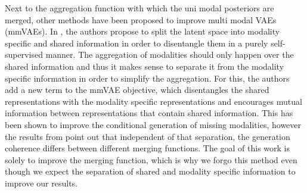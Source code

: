 Next to the aggregation function with which the uni modal posteriors are merged, other methods have been proposed to improve multi modal VAEs (mmVAEs).
In \citep{daun_disent}, the authors propose to split the latent space into modality specific and shared information in order to disentangle \citep{burgess_understanding_2018} them in a purely self-supervised manner.
The aggregation of modalities should only happen over the shared information and thus it makes sense to separate it from the modality specific information in order to simplify the aggregation.
For this, the authors add a new term to the mmVAE objective, which disentangles the shared representations with the modality specific representations and encourages mutual information between representations that contain shared information.
This has been shown to improve the conditional generation of missing modalities, however the results from \citep{sutter_multimodal_2020} point out that independent of that separation, the generation coherence differs between different merging functions.
The goal of this work is solely to improve the merging function, which is why we forgo this method even though we expect the separation of shared and modality specific information to improve our results.
